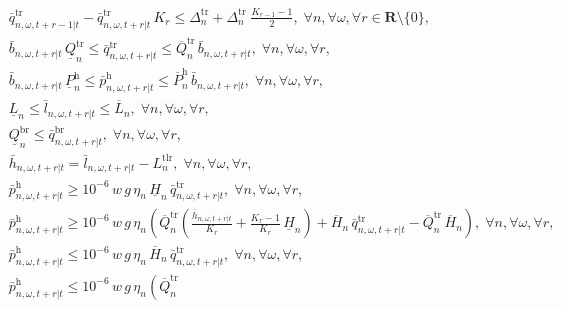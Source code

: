 \documentclass[a4paper,fleqn]{cas-sc}
\begin{document}
\begin{subequations}
\begin{align}
\label{eq:TSA_cen_sto_ramping1}\\
& \bar{q}^{\mathrm{tr}}_{n, \omega, t+r-1|t} - \bar{q}^{\mathrm{tr}}_{n, \omega, t+r|t} \, K_{r} \leq
\Delta^{\mathrm{tr}}_{n} + \Delta^{\mathrm{tr}}_{n} \; \frac{K_{r - 1} - 1}{2}, \; \forall n, \forall \omega, \forall r \in \boldsymbol{R} \setminus \{0\}, \label{eq:TSA_cen_sto_ramping2}\\
& \bar{b}_{n, \omega, t+r|t} \, \underline{Q}^{\mathrm{tr}}_{n} \leq \bar{q}^{\mathrm{tr}}_{n, \omega, t+r | t} \leq \overline{Q}^{\mathrm{tr}}_{n} \, \bar{b}_{n, \omega, t+r|t}, \; \forall n, \forall \omega, \forall r, 
\label{eq:TSA_cen_sto_tr_lim}\\
& \bar{b}_{n, \omega, t+r|t} \, \underline{P}^{\mathrm{h}}_{n} \leq \bar{p}^{\mathrm{h}}_{n, \omega, t+r | t} \leq \overline{P}^{\mathrm{h}}_{n} \, \bar{b}_{n, \omega, t+r|t}, \; \forall n, \forall \omega, \forall r, 
\label{eq:TSA_cen_sto_ph_lim}\\
& \underline{L}_{n} \leq \bar{l}_{n, \omega, t+r | t} \leq \overline{L}_{n}, \; \forall n, \forall \omega, \forall r,
\label{eq:TSA_cen_sto_wl_lim}\\
& \underline{Q}^{\mathrm{br}}_{n} \leq \bar{q}^{\mathrm{br}}_{n, \omega, t+r | t}, \; \forall n, \forall \omega, \forall r,
\label{eq:TSA_cen_sto_br_lim}\\
& \bar{h}_{n, \omega, t+r|t} = \bar{l}_{n, \omega, t+r|t} - L^{\mathrm{tlr}}_{n},
\; \forall n, \forall \omega, \forall r,
\label{eq:TSA_cen_sto_head}\\
& \bar{p}^{\mathrm{h}}_{n, \omega, t+r|t} \geq 10^{-6} \, w \, g \, \eta_n \, \underline{H}_{n} \, \bar{q}^{\mathrm{tr}}_{n, \omega, t+r|t}, \; \forall n, \forall \omega, \forall r, 
\label{eq:TSA_cen_sto_McCormick1}\\
& \bar{p}^{\mathrm{h}}_{n, \omega, t+r|t} \geq 10^{-6} \, w \, g \, \eta_n \left(
\overline{Q}^{\mathrm{tr}}_{n}
\left(\frac{\bar{h}_{n, \omega, t+r|t}}{K_r} + \frac{K_r - 1}{K_r} \, \underline{H}_n \right)
+ \overline{H}_{n} \, \bar{q}^{\mathrm{tr}}_{n, \omega, t+r|t} - \overline{Q}^{\mathrm{tr}}_{n}  \, \overline{H}_{n}\right), \; \forall n, \forall \omega, \forall r, 
\label{eq:TSA_cen_sto_McCormick2}\\
& \bar{p}^{\mathrm{h}}_{n, \omega, t+r|t} \leq 10^{-6} \, w \, g \, \eta_n \, \overline{H}_{n} \, \bar{q}^{\mathrm{tr}}_{n, \omega, t+r|t}, \; \forall n, \forall \omega, \forall r,
\label{eq:TSA_cen_sto_McCormick3}\\
& \bar{p}^{\mathrm{h}}_{n, \omega, t+r|t} \leq 10^{-6} \, w \, g \, \eta_n \left(\overline{Q}^{\mathrm{tr}}_{n} 

\end{align}
\end{subequations}
\end{document}
